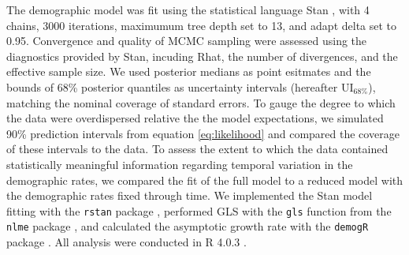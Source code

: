 The demographic model was fit using the statistical language Stan \citep{carpenter2017stan},
with 4 chains, 3000 iterations, maximumum tree depth set to 13, and adapt delta set to 0.95.
Convergence and quality of MCMC sampling were assessed using the diagnostics provided by Stan, 
incuding Rhat, the number of divergences, and the effective sample size.
We used posterior medians as point esitmates 
and the bounds of 68\% posterior quantiles as uncertainty intervals 
(hereafter $\text{UI}_{68\%}$), 
matching the nominal coverage of standard errors.
To gauge the degree to which the data were overdispersed relative 
the the model expectations, 
we simulated 90\% prediction intervals from equation \ref{eq:likelihood} 
and compared the coverage of these intervals to the data.
To assess the extent to which the data contained statistically meaningful information 
regarding temporal variation in the demographic rates,
we compared the fit of the full model to a reduced model with the demographic
rates fixed through time.
We implemented the Stan model fitting with the \texttt{rstan} package \citep{stan2020rstan},
performed GLS with the \texttt{gls} function from the \texttt{nlme} package \citep{pinheiro2020nlme}, 
and calculated the asymptotic growth rate with the \texttt{demogR} package \citep{holland2007demogR}.
All analysis were conducted in R 4.0.3 \citep{r2020}. 

